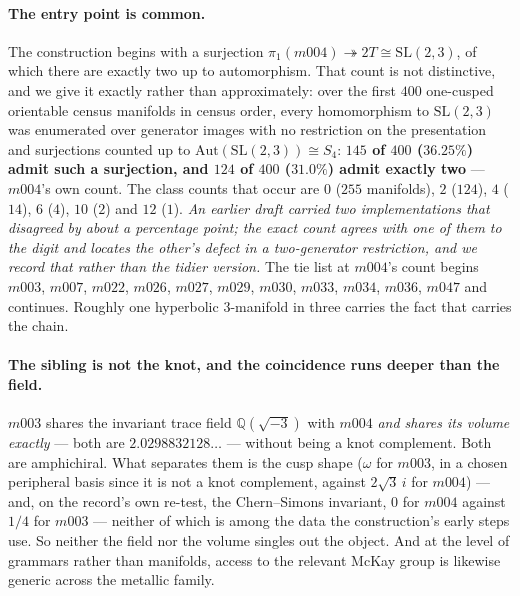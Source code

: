 \documentclass[11pt,a4paper]{article}
\theoremstyle{definition}
\theoremstyle{remark}
\newcommand{\Q}{\mathbb{Q}}
\begin{document}
\paragraph{The entry point is common.} The construction begins with a surjection
$\pi_1(m004) \twoheadrightarrow 2T \cong \mathrm{SL}(2,3)$, of which there are exactly two up to automorphism. That
count is not distinctive, and we give it exactly rather than approximately: over the first $400$ one-cusped
orientable census manifolds in census order, every homomorphism to $\mathrm{SL}(2,3)$ was enumerated over generator images with
no restriction on the presentation and surjections counted up to $\mathrm{Aut}(\mathrm{SL}(2,3)) \cong S_4$:
\textbf{$145$ of $400$ ($36.25\%$) admit such a surjection, and $124$ of $400$ ($31.0\%$) admit exactly two} ---
$m004$'s own count. The class counts that occur are $0$ ($255$ manifolds), $2$ ($124$), $4$ ($14$), $6$ ($4$), $10$
($2$) and $12$ ($1$). \emph{An earlier draft carried two implementations that disagreed by about a percentage
point; the exact count agrees with one of them to the digit and locates the other's defect in a two-generator
restriction, and we record that rather than the tidier version.} The tie list at $m004$'s count begins $m003$,
$m007$, $m022$, $m026$, $m027$, $m029$, $m030$, $m033$, $m034$, $m036$, $m047$ and continues.
Roughly one hyperbolic $3$-manifold in three carries the fact that carries the chain.

\paragraph{The sibling is not the knot, and the coincidence runs deeper than the field.} $m003$
shares the invariant trace field $\Q(\sqrt{-3})$ with $m004$ \emph{and shares its volume exactly}
--- both are $2.0298832128\ldots$ --- without being a knot complement. Both are amphichiral. What
separates them is the cusp shape ($\omega$ for $m003$, in a chosen peripheral basis since it is not a knot complement,
against $2\sqrt3\,i$ for $m004$) --- and, on the record's own re-test, the Chern--Simons invariant, $0$ for $m004$ against
$1/4$ for $m003$ --- neither of which is among the data the
construction's early steps use. So neither the field nor the volume singles out the object. And at the level of grammars rather than manifolds, access to the relevant McKay group is
likewise generic across the metallic family.
\end{document}
